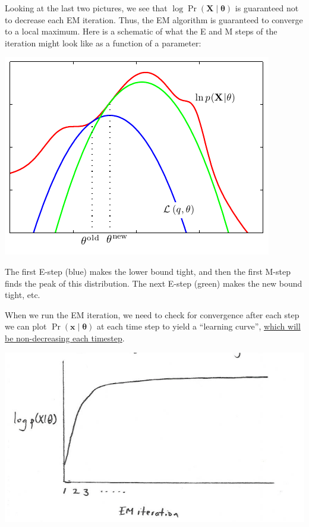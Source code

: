 \documentclass[11pt]{article}
\begin{document}
Looking at the last two pictures, we see that
$\log \Pr (\mathbf{X}\mid\symbf{\theta})$ is guaranteed not to decrease each EM
iteration. Thus, the EM algorithm is guaranteed to converge to a local maximum.
Here is a schematic of what the E and M steps of the iteration might look like
as a function of a parameter:
\begin{center}
  \includegraphics[scale=1]{Figure9-14.pdf}
\end{center}
The first E-step (blue) makes the lower bound tight, and then the first M-step
finds the peak of this distribution. The next E-step (green) makes the new
bound tight, etc.

When we run the EM iteration, we need to check for convergence after each step
we can plot $\Pr(\mathbf{x} \mid \symbf{\theta})$ at each time step to yield
a ``learning curve'', \underline{which will be non-decreasing each timestep}.
\begin{center}
  \includegraphics[scale=0.5]{LearningCurve.png}
\end{center}
\end{document}
